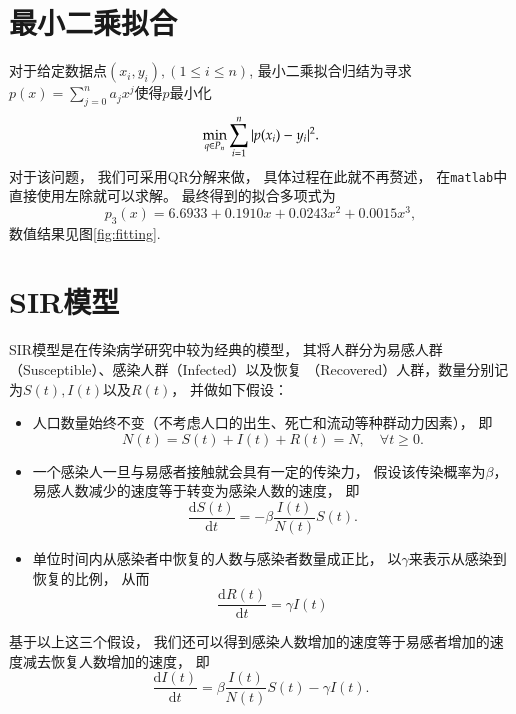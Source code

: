 \documentclass[a4paper]{article}
\newcommand{\dif}{\mathrm{d}}
\let\mathbb\relax %
\begin{document}
\begin{CJK*}{UTF8}{gkai}
  \section{最小二乘拟合}
  对于给定数据点$(x_i, y_i), (1\le i\le n)$,
  最小二乘拟合归结为寻求$p(x)=\sum_{j=0}^na_jx^j$使得$p$最小化
  \begin{displaymath}
    \min_{q\in\mathbb{P}_n}\sum_{i=1}^n|p(x_i)-y_i|^2.
  \end{displaymath}
  对于该问题，
  我们可采用QR分解来做，
  具体过程在此就不再赘述，
  在\verb|matlab|中直接使用左除就可以求解。
  最终得到的拟合多项式为
  \begin{displaymath}
    p_3(x) = 6.6933 + 0.1910x + 0.0243x^2+0.0015x^3,
  \end{displaymath}
  数值结果见图\ref{fig:fitting}.

  \section{SIR模型}
  SIR模型是在传染病学研究中较为经典的模型，
  其将人群分为易感人群（Susceptible）、感染人群（Infected）以及恢复
  （Recovered）人群，数量分别记为$S(t), I(t)$以及$R(t)$，
  并做如下假设：
  \begin{itemize}
  \item
    人口数量始终不变（不考虑人口的出生、死亡和流动等种群动力因素），
    即
    \begin{displaymath}
      N(t) = S(t) + I(t) + R(t) = N, \quad \forall t\ge 0.
    \end{displaymath}
  \item
    一个感染人一旦与易感者接触就会具有一定的传染力，
    假设该传染概率为$\beta$，
    易感人数减少的速度等于转变为感染人数的速度，
    即
    \begin{displaymath}
      \frac{\dif S(t)}{\dif t} = -\beta \frac{I(t)}{N(t)}S(t).
    \end{displaymath}
  \item
    单位时间内从感染者中恢复的人数与感染者数量成正比，
    以$\gamma$来表示从感染到恢复的比例，
    从而
    \begin{displaymath}
      \frac{\dif R(t)}{\dif t} = \gamma I(t)
    \end{displaymath}
  \end{itemize}
  基于以上这三个假设，
  我们还可以得到感染人数增加的速度等于易感者增加的速度减去恢复人数增加的速度，
  即
  \begin{displaymath}
    \frac{\dif I(t)}{\dif t} = \beta \frac{I(t)}{N(t)}S(t) - \gamma I(t).
  \end{displaymath}

\end{CJK*}
\end{document}
